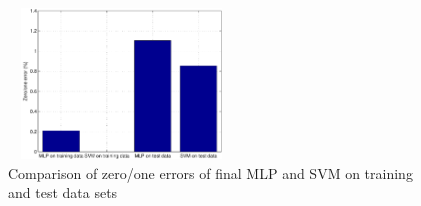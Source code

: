 \begin{figure}[htbp]
   \centering	
      \includegraphics[width=6cm, height=4cm]{figs/task4.pdf} 	
   \vspace{-0.3cm}
   \caption{Comparison of zero/one errors of final MLP and SVM on training and test data sets}\label{fig:task4}
\end{figure}




